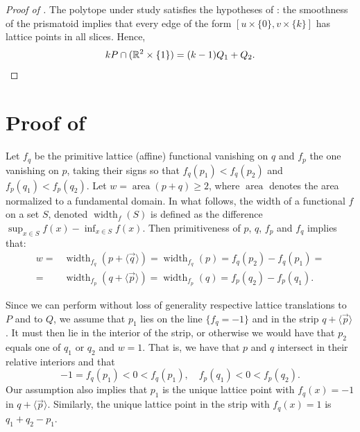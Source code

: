 \documentclass[12pt]{article}
\newcommand{\R}{ \ensuremath{\mathbb{R}}}
\newcommand{\width}{\operatorname{width}}
\newcommand{\area}{\operatorname{area}}
\newcommand{\vecline}[1]{\langle \vec #1 \rangle}
\begin{document}
\begin{proof}[Proof of ]
The polytope under study satisfies the hypotheses of : %
the smoothness of the prismatoid implies that every edge of the form $[u\times \{0\}, v\times \{k\}]$ has lattice points in all slices. 
Hence,
\[
kP \cap(\R^2\times\{1\}) = (k-1)Q_1 + Q_2.
\qedhere
\] 
\end{proof}




\section{Proof of }
\label{sec:the_lemma}

Let $f_q$ be the primitive lattice (affine) functional vanishing on $q$ and $f_p$ the one vanishing on $p$, taking their signs so that $f_q(p_1) < f_q(p_2)$ and $f_p(q_1) < f_p(q_2)$.
Let $w=\area(p+q) \geq 2$, where $\area$ denotes the area normalized to a fundamental domain. In what follows, the width of a functional $f$ on a set $S$, denoted $\width_f(S)$ is defined as the difference $\sup_{x\in S} f(x)-\inf_{x\in S} f(x)$.
Then primitiveness of $p$, $q$, $f_p$ and $f_q$ implies that:
\begin{align*}
w=&\width_{f_q}(p + \vecline q )=\width_{f_q}(p) = f_q(p_2) - f_q(p_1) =\\
=&\width_{f_p}(q +\vecline p ) = \width_{f_p}(q)= f_p(q_2) - f_p(q_1).
\end{align*}





%
Since we can perform without loss of generality respective lattice translations to $P$ and to $Q$, we assume that 
$p_1$ lies on the line $\{f_q=-1\}$ and in the strip $q +\vecline p$. It  must then lie in the interior of the strip, or otherwise we would have that $p_2$ equals one of  $q_1$ or $q_2$ and $w=1$. That is, we have that $p$ and $q$ intersect in their relative interiors and that
\[
-1=f_q(p_1) < 0 < f_q(p_1), \quad
f_p(q_1) < 0 < f_p(q_2).
\]
Our assumption also implies that $p_1$ is the unique lattice point with $f_q(x)=-1$ in $q +\vecline p$. Similarly, the unique lattice point in the strip with $f_q(x)=1$ is  $q_1+q_2 -p_1$.
\end{document}

